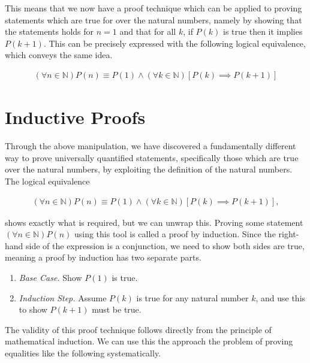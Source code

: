 \documentclass[twoside]{report}
\begin{document}
This means that we now have a proof technique which can be applied to proving statements which are true for over the natural numbers, namely by showing that the statements holds for $n = 1$ and that for all $k$, if $P(k)$ is true then it implies $P(k + 1)$. This can be precisely expressed with the following logical equivalence, which conveys the same idea.

\begin{align*}
	(\forall n \in \mathbb{N})P(n) \equiv P(1) \land (\forall k \in \mathbb{N})[P(k) \implies P(k + 1)]
\end{align*}

\section{Inductive Proofs}

Through the above manipulation, we have discovered a fundamentally different way to prove universally quantified statements, specifically those which are true over the natural numbers, by exploiting the definition of the natural numbers. The logical equivalence

\begin{align*}
	(\forall n \in \mathbb{N})P(n) \equiv P(1) \land (\forall k \in \mathbb{N})[P(k) \implies P(k + 1)],
\end{align*}

shows exactly what is required, but we can unwrap this. Proving some statement $(\forall n \in \mathbb{N})P(n)$ using this tool is called a proof by induction. Since the right-hand side of the expression is a conjunction, we need to show both sides are true, meaning a proof by induction has two separate parts.

\vspace{\baselineskip}
\begin{enumerate}
	\item \emph{Base Case.} Show $P(1)$ is true.
	\item \emph{Induction Step.} Assume $P(k)$ is true for any natural number $k$, and use this to show $P(k + 1)$ must be true.
\end{enumerate}
\vspace{\baselineskip}

The validity of this proof technique follows directly from the principle of mathematical induction. We can use this the approach the problem of proving equalities like the following systematically.
\end{document}
